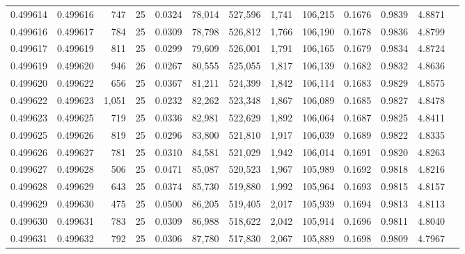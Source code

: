 \begin{tabular}{rrrrrrrrrrrrr}
0.499614 & 0.499616 &   747 &  25 &                                     0.0324 &  78,014 & 527,596 &   1,741 & 106,215 & 0.1676 & 0.9839 & 4.8871 \\
0.499616 & 0.499617 &   784 &  25 &                                     0.0309 &  78,798 & 526,812 &   1,766 & 106,190 & 0.1678 & 0.9836 & 4.8799 \\
0.499617 & 0.499619 &   811 &  25 &                                     0.0299 &  79,609 & 526,001 &   1,791 & 106,165 & 0.1679 & 0.9834 & 4.8724 \\
0.499619 & 0.499620 &   946 &  26 &                                     0.0267 &  80,555 & 525,055 &   1,817 & 106,139 & 0.1682 & 0.9832 & 4.8636 \\
0.499620 & 0.499622 &   656 &  25 &                                     0.0367 &  81,211 & 524,399 &   1,842 & 106,114 & 0.1683 & 0.9829 & 4.8575 \\
0.499622 & 0.499623 & 1,051 &  25 &                                     0.0232 &  82,262 & 523,348 &   1,867 & 106,089 & 0.1685 & 0.9827 & 4.8478 \\
0.499623 & 0.499625 &   719 &  25 &                                     0.0336 &  82,981 & 522,629 &   1,892 & 106,064 & 0.1687 & 0.9825 & 4.8411 \\
0.499625 & 0.499626 &   819 &  25 &                                     0.0296 &  83,800 & 521,810 &   1,917 & 106,039 & 0.1689 & 0.9822 & 4.8335 \\
0.499626 & 0.499627 &   781 &  25 &                                     0.0310 &  84,581 & 521,029 &   1,942 & 106,014 & 0.1691 & 0.9820 & 4.8263 \\
0.499627 & 0.499628 &   506 &  25 &                                     0.0471 &  85,087 & 520,523 &   1,967 & 105,989 & 0.1692 & 0.9818 & 4.8216 \\
0.499628 & 0.499629 &   643 &  25 &                                     0.0374 &  85,730 & 519,880 &   1,992 & 105,964 & 0.1693 & 0.9815 & 4.8157 \\
0.499629 & 0.499630 &   475 &  25 &                                     0.0500 &  86,205 & 519,405 &   2,017 & 105,939 & 0.1694 & 0.9813 & 4.8113 \\
0.499630 & 0.499631 &   783 &  25 &                                     0.0309 &  86,988 & 518,622 &   2,042 & 105,914 & 0.1696 & 0.9811 & 4.8040 \\
0.499631 & 0.499632 &   792 &  25 &                                     0.0306 &  87,780 & 517,830 &   2,067 & 105,889 & 0.1698 & 0.9809 & 4.7967 \\

\end{tabular}
